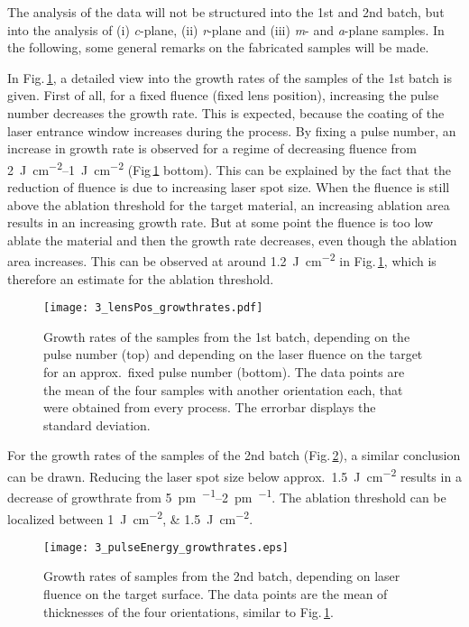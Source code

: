 The analysis of the data will not be structured into the 1st and 2nd batch, but into the analysis of (i) \textit{c}-plane, (ii) \textit{r}-plane and (iii) \textit{m}- and \textit{a}-plane samples.
In the following, some general remarks on the fabricated samples will be made.

In Fig.\,\ref{Fig:Results_3_lensGrowthRate}, a detailed view into the growth rates of the samples of the 1st batch is given.
First of all, for a fixed fluence (fixed lens position), increasing the pulse number decreases the growth rate.
This is expected, because the coating of the laser entrance window increases during the process.
By fixing a pulse number, an increase in growth rate is observed for a regime of decreasing fluence from \qtyrange{2}{1}{\joule\per\cm\squared} (Fig\,\ref{Fig:Results_3_lensGrowthRate} bottom).
This can be explained by the fact that the reduction of fluence is due to increasing laser spot size.
When the fluence is still above the ablation threshold for the target material, an increasing ablation area results in an increasing growth rate.
But at some point the fluence is too low ablate the material and then the growth rate decreases, even though the ablation area increases.
This can be observed at around \qty{1.2}{\joule\per\cm\squared} in Fig.\,\ref{Fig:Results_3_lensGrowthRate}, which is therefore an estimate for the ablation threshold.
\begin{figure}
    \centering
    \texttt{[image: 3\_lensPos\_growthrates.pdf]}
    \caption{
    Growth rates of the samples from the 1st batch, depending on the pulse number (top) and depending on the laser fluence on the target for an approx.\ fixed pulse number (bottom).
    The data points are the mean of the four samples with another orientation each, that were obtained from every process.
    The errorbar displays the standard deviation.
    }
    \label{Fig:Results_3_lensGrowthRate}
\end{figure}
%
For the growth rates of the samples of the 2nd batch (Fig.\,\ref{Fig:Results_3_pulseGrowthRate}), a similar conclusion can be drawn.
Reducing the laser spot size below approx.\ \qty{1.5}{\joule\per\cm\squared} results in a decrease of growthrate from \qtyrange{5}{2}{\pm\per\pulse}.
The ablation threshold can be localized between \qtylist{1;1.5}{\joule\per\cm\squared}.
\begin{figure}
    \centering
    \texttt{[image: 3\_pulseEnergy\_growthrates.eps]}
    \caption{Growth rates of samples from the 2nd batch, depending on laser fluence on the target surface.
    The data points are the mean of thicknesses of the four orientations, similar to Fig.\,\ref{Fig:Results_3_lensGrowthRate}.}
    \label{Fig:Results_3_pulseGrowthRate}
\end{figure}

